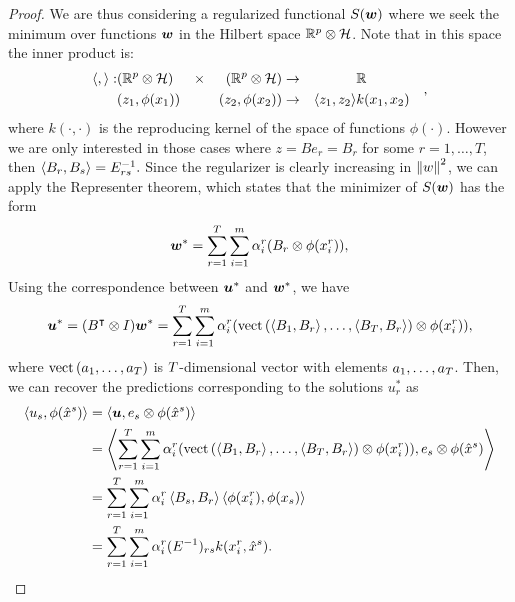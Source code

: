 \begin{proof}
We are thus considering a regularized functional $S(\bm{w})$ where we seek the minimum over functions $\bm{w}$ in the Hilbert space $\mathbb{R}^p \otimes \mathcal{H}$. Note that in this space the inner product is:
\begin{equation}
    \nonumber
    \begin{aligned}
        \left\langle ,  \right\rangle: &(\mathbb{R}^p \otimes \mathcal{H}) &\times& &(\mathbb{R}^p \otimes \mathcal{H}) &\to &&\mathbb{R} & \\
    &(z_1, \phi(x_1)) && &(z_2, \phi(x_2)) &\to &\left\langle z_1, z_2 \right\rangle &k(x_1, x_2) &
    \end{aligned},
\end{equation}
where $k(\cdot, \cdot)$ is the reproducing kernel of the space of functions $\phi(\cdot)$.
However we are only interested in those cases where $z = B e_r = B_r$ for some $r=1, \ldots, T$, then $\left\langle B_r, B_s \right\rangle = E^{-1}_{rs}.$
Since the regularizer is clearly increasing in $\left\lVert w\right\rVert^2$, we can apply the Representer theorem, which states that the minimizer of $S(\bm{w})$ has the form
\begin{equation}
    \nonumber
    {\bm{w}}^* = \sum_{r=1}^T \sum_{i=1}^m \alpha_i^r (B_r \otimes \phi(x_i^r)) ,
\end{equation}
Using the correspondence between ${\bm{u}}^*$ and ${\bm{w}}^*$, we have
\begin{equation}
    \nonumber
    {\bm{u}}^* = (B^\intercal \otimes I) {\bm{w}}^* =  \sum_{r=1}^T \sum_{i=1}^m \alpha_i^r (\bm{\text{vect}}\left(\left\langle B_1, B_r \right\rangle, \ldots, \left\langle B_T, B_r \right\rangle\right) \otimes \phi(x_i^r)),
\end{equation}
where $\bm{\text{vect}}\left(a_1, \ldots, a_T\right)$ is $T$-dimensional vector with elements $a_1, \ldots, a_T$.
Then, we can recover the predictions corresponding to the solutions $u_r^*$ as
\begin{equation}
    \nonumber
    \begin{aligned}
        \left\langle u_s, \phi(\hat{x}^s) \right\rangle &= \left\langle \bm{u}, e_s \otimes \phi(\hat{x}^s) \right\rangle \\
        &= \left\langle \sum_{r=1}^T \sum_{i=1}^m \alpha_i^r (\bm{\text{vect}}\left(\left\langle B_1, B_r \right\rangle, \ldots, \left\langle B_T, B_r \right\rangle\right) \otimes \phi(x_i^r)), e_s \otimes \phi(\hat{x}^s) \right\rangle \\
        &= \sum_{r=1}^T \sum_{i=1}^m \alpha_i^r  \left\langle B_s, B_r \right\rangle \left\langle \phi(x_i^r), \phi(x_s) \right\rangle \\
        &= \sum_{r=1}^T \sum_{i=1}^m \alpha_i^r  (E^{-1})_{rs} k(x_i^r, \hat{x}^s).
    \end{aligned}
\end{equation}
\end{proof}
